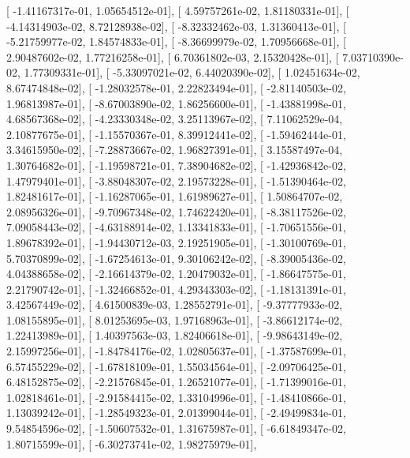\documentclass{article}
\begin{document}
       [ -1.41167317e-01,   1.05654512e-01],
       [  4.59757261e-02,   1.81180331e-01],
       [ -4.14314903e-02,   8.72128938e-02],
       [ -8.32332462e-03,   1.31360413e-01],
       [ -5.21759977e-02,   1.84574833e-01],
       [ -8.36699979e-02,   1.70956668e-01],
       [  2.90487602e-02,   1.77216258e-01],
       [  6.70361802e-03,   2.15320428e-01],
       [  7.03710390e-02,   1.77309331e-01],
       [ -5.33097021e-02,   6.44020390e-02],
       [  1.02451634e-02,   8.67474848e-02],
       [ -1.28032578e-01,   2.22823494e-01],
       [ -2.81140503e-02,   1.96813987e-01],
       [ -8.67003890e-02,   1.86256600e-01],
       [ -1.43881998e-01,   4.68567368e-02],
       [ -4.23330348e-02,   3.25113967e-02],
       [  7.11062529e-04,   2.10877675e-01],
       [ -1.15570367e-01,   8.39912441e-02],
       [ -1.59462444e-01,   3.34615950e-02],
       [ -7.28873667e-02,   1.96827391e-01],
       [  3.15587497e-04,   1.30764682e-01],
       [ -1.19598721e-01,   7.38904682e-02],
       [ -1.42936842e-02,   1.47979401e-01],
       [ -3.88048307e-02,   2.19573228e-01],
       [ -1.51390464e-02,   1.82481617e-01],
       [ -1.16287065e-01,   1.61989627e-01],
       [  1.50864707e-02,   2.08956326e-01],
       [ -9.70967348e-02,   1.74622420e-01],
       [ -8.38117526e-02,   7.09058443e-02],
       [ -4.63188914e-02,   1.13341833e-01],
       [ -1.70651556e-01,   1.89678392e-01],
       [ -1.94430712e-03,   2.19251905e-01],
       [ -1.30100769e-01,   5.70370899e-02],
       [ -1.67254613e-01,   9.30106242e-02],
       [ -8.39005436e-02,   4.04388658e-02],
       [ -2.16614379e-02,   1.20479032e-01],
       [ -1.86647575e-01,   2.21790742e-01],
       [ -1.32466852e-01,   4.29343303e-02],
       [ -1.18131391e-01,   3.42567449e-02],
       [  4.61500839e-03,   1.28552791e-01],
       [ -9.37777933e-02,   1.08155895e-01],
       [  8.01253695e-03,   1.97168963e-01],
       [ -3.86612174e-02,   1.22413989e-01],
       [  1.40397563e-03,   1.82406618e-01],
       [ -9.98643149e-02,   2.15997256e-01],
       [ -1.84784176e-02,   1.02805637e-01],
       [ -1.37587699e-01,   6.57455229e-02],
       [ -1.67818109e-01,   1.55034564e-01],
       [ -2.09706425e-01,   6.48152875e-02],
       [ -2.21576845e-01,   1.26521077e-01],
       [ -1.71399016e-01,   1.02818461e-01],
       [ -2.91584415e-02,   1.33104996e-01],
       [ -1.48410866e-01,   1.13039242e-01],
       [ -1.28549323e-01,   2.01399044e-01],
       [ -2.49499834e-01,   9.54854596e-02],
       [ -1.50607532e-01,   1.31675987e-01],
       [ -6.61849347e-02,   1.80715599e-01],
       [ -6.30273741e-02,   1.98275979e-01],
\end{document}
